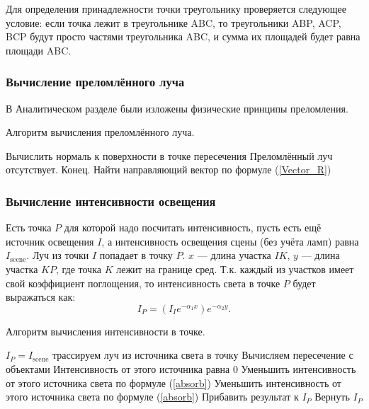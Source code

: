 \documentclass[14pt,a4paper]{extarticle}
\begin{document}
    		Для определения принадлежности точки треугольнику проверяется следующее условие: 
    		если точка лежит в треугольнике ABC, 
    		то треугольники ABP, ACP, BCP будут просто частями треугольника ABC, 
    		и сумма их площадей будет равна площади ABC.
    	
    	\subsubsection*{Вычисление преломлённого луча}
    		В Аналитическом разделе были изложены физические принципы преломления.
    		\begin{algorithm}[H]
    			\caption{Алгоритм вычисления преломлённого луча.}
    			\begin{algorithmic}[1]
    				\BeginAlgorithm
    				\State Вычислить нормаль к поверхности в точке пересечения
    					\State Преломлённый луч отсутствует. Конец.
    				\State Найти направляющий вектор по формуле (\ref{Vector_R})
    				\EndIf
    				\EndAlgorithm
    			\end{algorithmic}
    		\end{algorithm}
    	
    	\subsubsection*{Вычисление интенсивности освещения}
    		Есть точка $P$ для которой надо посчитать интенсивность, пусть есть ещё источник освещения $I$, 
    		а интенсивность освещения сцены (без учёта ламп) равна $I_{\mathrm{scene}}$. 
    		Луч из точки $I$ попадает в точку $P$. 
    		$x$ --- длина участка $IK$, 
    		$y$ --- длина участка $KP$,
    		где точка $K$ лежит на границе сред. 
    		Т.к. каждый из участков имеет свой коэффициент поглощения, то интенсивность света в точке $P$ будет выражаться как:
    		\begin{equation*}
    			I_P = (I_Ie^{-\alpha_1x})e^{-\alpha_2y}.
    		\end{equation*}
    		\begin{algorithm}[H]
    			\caption{Алгоритм вычисления интенсивности в точке.}
    			\begin{algorithmic}[1]
    				\BeginAlgorithm
    				\State $I_P = I_{\mathrm{scene}}$
    					\State трассируем луч из источника света в точку
    					\State Вычисляем пересечение с объектами
    							\State Интенсивность от этого источника равна 0
    						\Else Уменьшить интенсивность от этого источника света по формуле (\ref{absorb})
    						\EndIf
    					\Else Уменьшить интенсивность от этого источника света по формуле (\ref{absorb})
    					\EndIf
    					\State Прибавить результат к $I_P$
    				\EndFor
    				\State Вернуть $I_P$	
    				\EndAlgorithm	
    			\end{algorithmic}
    		\end{algorithm}
\end{document}
